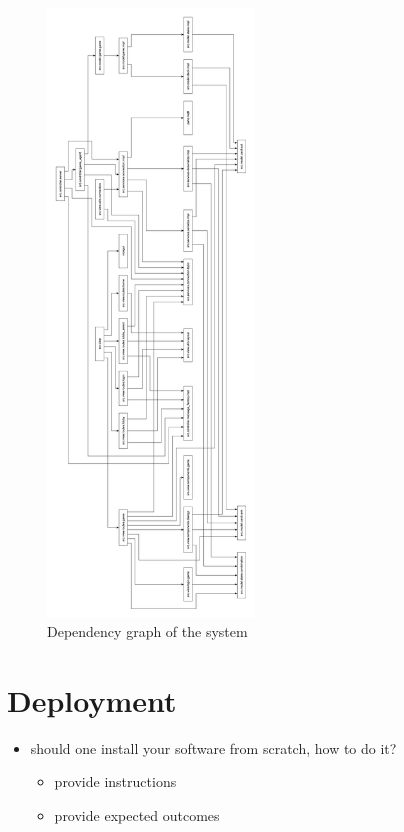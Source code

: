 \documentclass{scrartcl}
\begin{document}
\begin{figure}[H]
      \centering
      \includegraphics[width=0.49\textwidth]{figures/dependencyGraph.png}
      \caption{Dependency graph of the system}
      \label{fig:dependencyGraph}
\end{figure}

\section{Deployment}\label{deployment}

\begin{itemize}
      \item should one install your software from scratch, how to do it?

            \begin{itemize}
                  \item provide instructions
                  \item provide expected outcomes
            \end{itemize}
\end{itemize}
\end{document}
